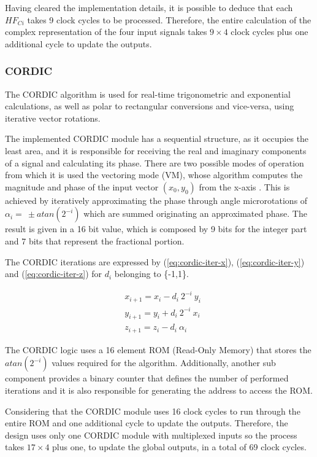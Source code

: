 Having cleared the implementation details, it is possible to deduce that each $HF_{Ci}$ takes 9 clock cycles to be processed. Therefore, the entire calculation of the complex representation of the four input signals takes $9 \times 4$ clock cycles plus one additional cycle to update the outputs.

\subsubsection{CORDIC}

The CORDIC algorithm is used for real-time trigonometric and exponential calculations, as well as polar to rectangular conversions and vice-versa, using iterative vector rotations. 

The implemented CORDIC module has a sequential structure, as it occupies the least area, and it is responsible for receiving the real and imaginary components of a signal and calculating its phase. There are two possible modes of operation from which it is used the vectoring mode (VM), whose algorithm computes the magnitude and phase of the input vector $(x_0, y_0)$ from the x-axis \cite{cordic-def}. This is achieved by iteratively approximating the phase through angle microrotations of $\alpha_i = \ \pm atan(2^{-i})$ which are summed originating an approximated phase. The result is given in a 16 bit value, which is composed by 9 bits for the integer part and 7 bits that represent the fractional portion. 

The CORDIC iterations are expressed by (\ref{eq:cordic-iter-x}), (\ref{eq:cordic-iter-y}) and (\ref{eq:cordic-iter-z}) for $d_i$ belonging to \{-1,1\}.

\begin{eqnarray}
	& x_{i+1} = x_i - d_i \ 2^{-i} \ y_i
	\label{eq:cordic-iter-x}  \\
	& y_{i+1} = y_i + d_i \ 2^{-i} \ x_i
	\label{eq:cordic-iter-y} \\
	& z_{i+1} = z_i - d_i \ \alpha_i
	\label{eq:cordic-iter-z}
\end{eqnarray}

The CORDIC logic uses a 16 element ROM (Read-Only Memory) that stores the $atan(2^{-i})$ values required for the algorithm. Additionally, another sub component provides a binary counter that defines the number of performed iterations and it is also responsible for generating the address to access the ROM. 

Considering that the CORDIC module uses 16 clock cycles to run through the entire ROM and one additional cycle to update the outputs. Therefore, the design uses only one CORDIC module with multiplexed inputs so the process takes $17 \times 4$ plus one, to update the global outputs, in a total of 69 clock cycles.

